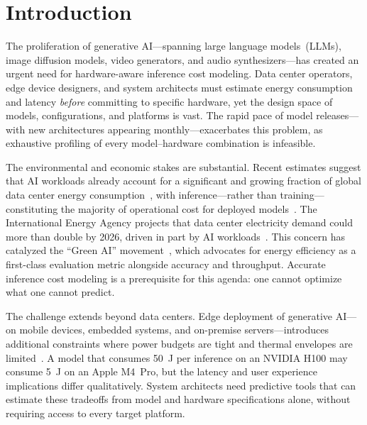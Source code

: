 \documentclass[preprint,review,12pt]{elsarticle}
\begin{document}
\linenumbers

\section{Introduction}
\label{sec:introduction}

The proliferation of generative AI---spanning large language models~(LLMs), image diffusion models, video generators, and audio synthesizers---has created an urgent need for hardware-aware inference cost modeling.
Data center operators, edge device designers, and system architects must estimate energy consumption and latency \emph{before} committing to specific hardware, yet the design space of models, configurations, and platforms is vast.
The rapid pace of model releases---with new architectures appearing monthly---exacerbates this problem, as exhaustive profiling of every model--hardware combination is infeasible.

The environmental and economic stakes are substantial.
Recent estimates suggest that AI workloads already account for a significant and growing fraction of global data center energy consumption~\cite{patterson2021carbon,wu2022sustainable}, with inference---rather than training---constituting the majority of operational cost for deployed models~\cite{desislavov2023trends}.
The International Energy Agency projects that data center electricity demand could more than double by 2026, driven in part by AI workloads~\cite{iea2024electricity}.
This concern has catalyzed the ``Green AI'' movement~\cite{schwartz2020green}, which advocates for energy efficiency as a first-class evaluation metric alongside accuracy and throughput.
Accurate inference cost modeling is a prerequisite for this agenda: one cannot optimize what one cannot predict.

The challenge extends beyond data centers.
Edge deployment of generative AI---on mobile devices, embedded systems, and on-premise servers---introduces additional constraints where power budgets are tight and thermal envelopes are limited~\cite{xu2024survey_edge}.
A model that consumes \SI{50}{\joule} per inference on an NVIDIA H100 may consume \SI{5}{\joule} on an Apple M4~Pro, but the latency and user experience implications differ qualitatively.
System architects need predictive tools that can estimate these tradeoffs from model and hardware specifications alone, without requiring access to every target platform.
\end{document}
